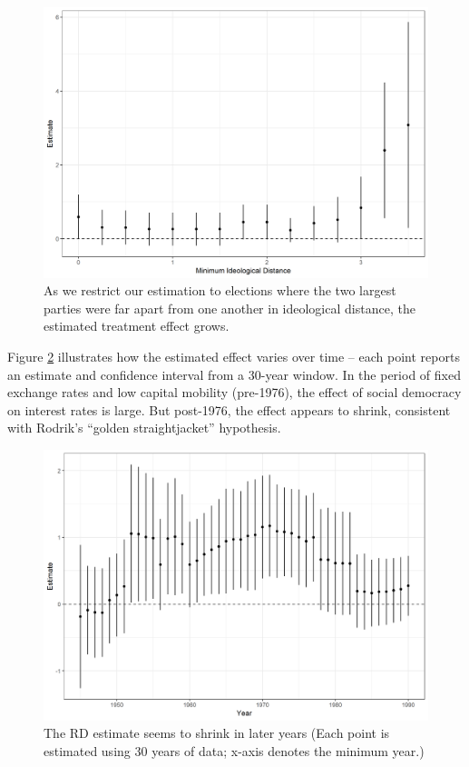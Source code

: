 \documentclass[12pt]{article}
\begin{document}
\begin{figure}[h]
	\centering
	\includegraphics[width=\linewidth]{Figures/rdEstimateVaryingIdeologyDistance}
	\caption{As we restrict our estimation to elections where the two largest parties were far apart from one another in ideological distance, the estimated treatment effect grows.}
	\label{fig:rdEstimateVaryingIdeologyDistance}
\end{figure}

Figure \ref{fig:rdEstimateVaryingYear} illustrates how the estimated effect varies over time -- each point reports an estimate and confidence interval from a 30-year window. In the period of fixed exchange rates and low capital mobility (pre-1976), the effect of social democracy on interest rates is large. But post-1976, the effect appears to shrink, consistent with Rodrik's ``golden straightjacket'' hypothesis. 

\begin{figure}
\centering
\includegraphics[width=\linewidth]{Figures/rdEstimateVaryingYear}
\caption{The RD estimate seems to shrink in later years (Each point is estimated using 30 years of data; x-axis denotes the minimum year.)}
\label{fig:rdEstimateVaryingYear}
\end{figure}
\end{document}
